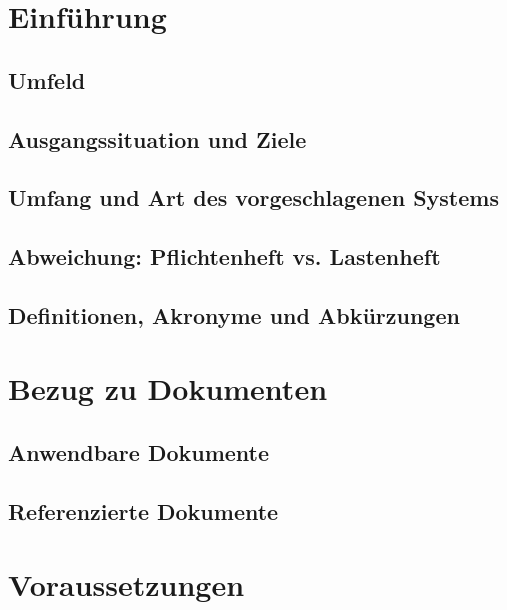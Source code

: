 \section{Einführung}


\subsection{Umfeld}
\label{subsec:1_1_umfeld}


\subsection{Ausgangssituation und Ziele}


\subsection{Umfang und Art des vorgeschlagenen Systems}


\subsection{Abweichung: Pflichtenheft vs. Lastenheft}


\subsection{Definitionen, Akronyme und Abkürzungen}



\section{Bezug zu Dokumenten}

\subsection{Anwendbare Dokumente}


\subsection{Referenzierte Dokumente}



\section{Voraussetzungen}
\label{sec:vorraussetzungen}

